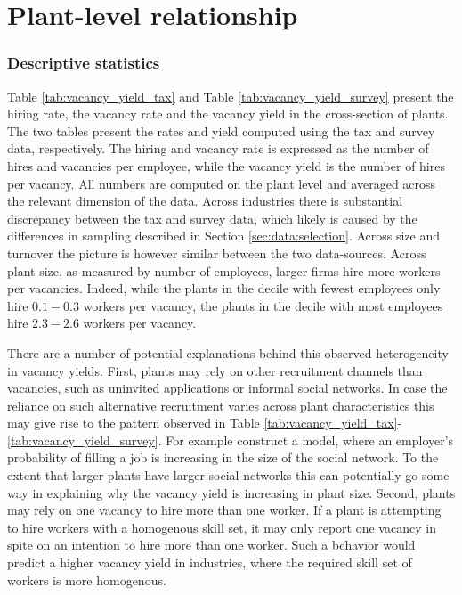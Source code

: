\section{Plant-level relationship}
\label{sec:basic_rel}

\subsubsection{Descriptive statistics}

Table \ref{tab:vacancy_yield_tax} and Table \ref{tab:vacancy_yield_survey} present the hiring rate, the vacancy rate and the vacancy yield in the cross-section of plants. The two tables present the rates and yield computed using the tax and survey data, respectively. The hiring and vacancy rate is expressed as the number of hires and vacancies per employee, while the vacancy yield is the number of hires per vacancy. All numbers are computed on the plant level and averaged across the relevant dimension of the data. Across industries there is substantial discrepancy between the tax and survey data, which likely is caused by the differences in sampling described in Section \ref{sec:data:selection}. Across size and turnover the picture is however similar between the two data-sources. Across plant size, as measured by number of employees, larger firms hire more workers per vacancies. Indeed, while the plants in the decile with fewest employees only hire $0.1-0.3$ workers per vacancy, the plants in the decile with most employees hire $2.3-2.6$ workers per vacancy. %


There are a number of potential explanations behind this observed heterogeneity in vacancy yields. First, plants may rely on other recruitment channels than vacancies, such as uninvited applications or informal social networks. In case the reliance on such alternative recruitment varies across plant characteristics this may give rise to the pattern observed in Table \ref{tab:vacancy_yield_tax}-\ref{tab:vacancy_yield_survey}. For example \cite{Cahuc2009} construct a model, where an employer's probability of filling a job is increasing in the size of the social network. To the extent that larger plants have larger social networks this can potentially go some way in explaining why the vacancy yield is increasing in plant size. Second, plants may rely on one vacancy to hire more than one worker. If a plant is attempting to hire workers with a homogenous skill set, it may only report one vacancy in spite on an intention to hire more than one worker. Such a behavior would predict a higher vacancy yield in industries, where the required skill set of workers is more homogenous.

